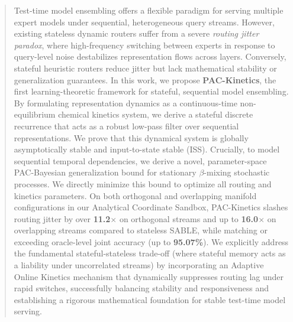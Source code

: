 \begin{abstract}
Test-time model ensembling offers a flexible paradigm for serving multiple expert models under sequential, heterogeneous query streams. However, existing stateless dynamic routers suffer from a severe \emph{routing jitter paradox}, where high-frequency switching between experts in response to query-level noise destabilizes representation flows across layers. Conversely, stateful heuristic routers reduce jitter but lack mathematical stability or generalization guarantees. In this work, we propose \textbf{PAC-Kinetics}, the first learning-theoretic framework for stateful, sequential model ensembling. By formulating representation dynamics as a continuous-time non-equilibrium chemical kinetics system, we derive a stateful discrete recurrence that acts as a robust low-pass filter over sequential representations. We prove that this dynamical system is globally asymptotically stable and input-to-state stable (ISS). Crucially, to model sequential temporal dependencies, we derive a novel, parameter-space PAC-Bayesian generalization bound for stationary $\beta$-mixing stochastic processes. We directly minimize this bound to optimize all routing and kinetics parameters. On both orthogonal and overlapping manifold configurations in our Analytical Coordinate Sandbox, PAC-Kinetics slashes routing jitter by over \textbf{11.2$\times$} on orthogonal streams and up to \textbf{16.0$\times$} on overlapping streams compared to stateless SABLE, while matching or exceeding oracle-level joint accuracy (up to \textbf{95.07\%}). We explicitly address the fundamental stateful-stateless trade-off (where stateful memory acts as a liability under uncorrelated streams) by incorporating an Adaptive Online Kinetics mechanism that dynamically suppresses routing lag under rapid switches, successfully balancing stability and responsiveness and establishing a rigorous mathematical foundation for stable test-time model serving.
\end{abstract}
